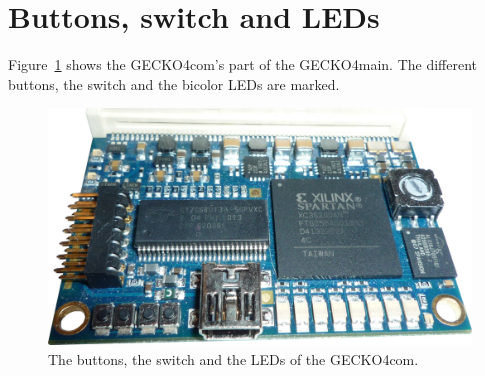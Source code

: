 \section{Buttons, switch and LEDs}
Figure~\ref{fig:but sw leds} shows the {\sc GECKO4com}'s part of the {\sc GECKO4main}. The
different buttons, the switch and the bicolor LEDs are marked.
\begin{figure}[h]
\centering%
\includegraphics[width=\columnwidth]{figs/gecko4com}
\caption{The buttons, the switch and the LEDs of the {\sc GECKO4com}.}
\label{fig:but sw leds}
\end{figure}
\newpage
